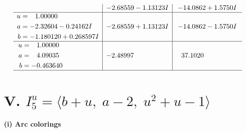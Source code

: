 \documentclass[1p]{elsarticle_modified}
\theoremstyle{definition}
\begin{document}
$$\begin{array}{c|c|c}
 & -2.68559 - 1.13123 I & -14.0862 + 1.5750 I \\ \hline\begin{aligned}
u &= \phantom{-}1.00000\phantom{ +0.000000I} \\
a &= -2.32604 - 0.24162 I \\
b &= -1.180120 + 0.268597 I\end{aligned}
 & -2.68559 + 1.13123 I & -14.0862 - 1.5750 I \\ \hline\begin{aligned}
u &= \phantom{-}1.00000\phantom{ +0.000000I} \\
a &= \phantom{-}4.09035\phantom{ +0.000000I} \\
b &= -0.463640\phantom{ +0.000000I}\end{aligned}
 & -2.48997\phantom{ +0.000000I} & \phantom{-}37.1020\phantom{ +0.000000I}\\
 \hline 
 \end{array}$$\newpage\newpage\renewcommand{\arraystretch}{1}
\centering \section*{V. $I^u_{5}= \langle b+u,\;a-2,\;u^2+u-1 \rangle$}
\flushleft \textbf{(i) Arc colorings}\\
\end{document}

